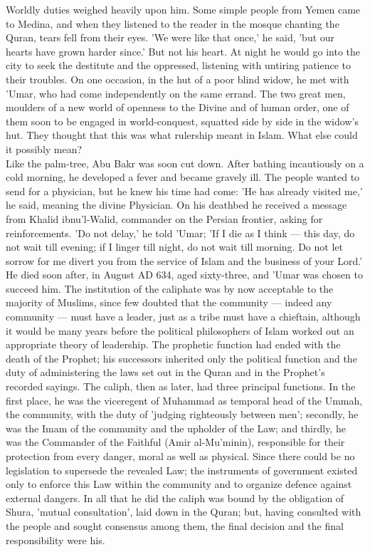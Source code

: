 \documentclass[11pt, b5paper, twoside]{book}
\begin{document}
Worldly duties weighed heavily upon him. Some simple people from Yemen came to Medina, and when they listened to the reader in the mosque chanting the Quran, tears fell from their eyes. 'We were like that once,' he said, 'but our hearts have grown harder since.' But not his heart. At night he would go into the city to seek the destitute and the oppressed, listening with untiring patience to their troubles. On one occasion, in the hut of a poor blind widow, he met with 'Umar, who had come independently on the same errand. The two great men, moulders of a new world of openness to the Divine and of human order, one of them soon to be engaged in world-conquest, squatted side by side in the widow's hut. They thought that this was what rulership meant in Islam. What else could it possibly mean? \\

Like the palm-tree, Abu Bakr was soon cut down. After bathing incautiously on a cold morning, he developed a fever and became gravely ill. The people wanted to send for a physician, but he knew his time had come: 'He has already visited me,' he said, meaning the divine Physician. On his deathbed he received a message from Khalid ibnu'l-Walid, commander on the Persian frontier, asking for reinforcements. 'Do not delay,' he told 'Umar; 'If I die as I think --- this day, do not wait till evening; if I linger till night, do not wait till morning. Do not let sorrow for me divert you from the service of Islam and the business of your Lord.' \\

He died soon after, in August AD 634, aged sixty-three, and 'Umar was chosen to succeed him. The institution of the caliphate was by now acceptable to the majority of Muslims, since few doubted that the community --- indeed any community --- must have a leader, just as a tribe must have a chieftain, although it would be many years before the political philosophers of Islam worked out an appropriate theory of leadership. The prophetic function had ended with the death of the Prophet; his successors inherited only the political function and the duty of administering the laws set out in the Quran and in the Prophet's recorded sayings. The caliph, then as later, had three principal functions. In the first place, he was the viceregent of Muhammad as temporal head of the Ummah, the community, with the duty of 'judging righteously between men'; secondly, he was the Imam of the community and the upholder of the Law; and thirdly, he was the Commander of the Faithful (Amir al-Mu'minin), responsible for their protection from every danger, moral as well as physical. Since there could be no legislation to supersede the revealed Law; the instruments of government existed only to enforce this Law within the community and to organize defence against external dangers. In all that he did the caliph was bound by the obligation of Shura, 'mutual consultation', laid down in the Quran; but, having consulted with the people and sought consensus among them, the final decision and the final responsibility were his. \\
\end{document}

